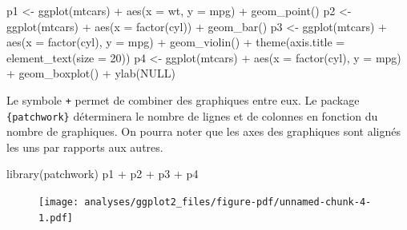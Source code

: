 \documentclass[
  letterpaper,
  DIV=11,
  numbers=noendperiod,
  oneside]{scrreprt}
\newenvironment{Shaded}{\begin{snugshade}}{\end{snugshade}}
\newcommand{\AttributeTok}[1]{\textcolor[rgb]{0.40,0.45,0.13}{#1}}
\newcommand{\ConstantTok}[1]{\textcolor[rgb]{0.56,0.35,0.01}{#1}}
\newcommand{\DecValTok}[1]{\textcolor[rgb]{0.68,0.00,0.00}{#1}}
\newcommand{\FunctionTok}[1]{\textcolor[rgb]{0.28,0.35,0.67}{#1}}
\newcommand{\NormalTok}[1]{\textcolor[rgb]{0.00,0.23,0.31}{#1}}
\newcommand{\OtherTok}[1]{\textcolor[rgb]{0.00,0.23,0.31}{#1}}
\newcommand{\SpecialCharTok}[1]{\textcolor[rgb]{0.37,0.37,0.37}{#1}}
\begin{document}
\begin{Shaded}
\begin{Highlighting}[]
\NormalTok{p1 }\OtherTok{\textless{}{-}} \FunctionTok{ggplot}\NormalTok{(mtcars) }\SpecialCharTok{+}
  \FunctionTok{aes}\NormalTok{(}\AttributeTok{x =}\NormalTok{ wt, }\AttributeTok{y =}\NormalTok{ mpg) }\SpecialCharTok{+} 
  \FunctionTok{geom\_point}\NormalTok{()}
\NormalTok{p2 }\OtherTok{\textless{}{-}} \FunctionTok{ggplot}\NormalTok{(mtcars) }\SpecialCharTok{+}
  \FunctionTok{aes}\NormalTok{(}\AttributeTok{x =} \FunctionTok{factor}\NormalTok{(cyl)) }\SpecialCharTok{+}
  \FunctionTok{geom\_bar}\NormalTok{()}
\NormalTok{p3 }\OtherTok{\textless{}{-}} \FunctionTok{ggplot}\NormalTok{(mtcars) }\SpecialCharTok{+}
  \FunctionTok{aes}\NormalTok{(}\AttributeTok{x =} \FunctionTok{factor}\NormalTok{(cyl), }\AttributeTok{y =}\NormalTok{ mpg) }\SpecialCharTok{+}
  \FunctionTok{geom\_violin}\NormalTok{() }\SpecialCharTok{+}
  \FunctionTok{theme}\NormalTok{(}\AttributeTok{axis.title =} \FunctionTok{element\_text}\NormalTok{(}\AttributeTok{size =} \DecValTok{20}\NormalTok{))}
\NormalTok{p4 }\OtherTok{\textless{}{-}} \FunctionTok{ggplot}\NormalTok{(mtcars) }\SpecialCharTok{+}
  \FunctionTok{aes}\NormalTok{(}\AttributeTok{x =} \FunctionTok{factor}\NormalTok{(cyl), }\AttributeTok{y =}\NormalTok{ mpg) }\SpecialCharTok{+} 
  \FunctionTok{geom\_boxplot}\NormalTok{() }\SpecialCharTok{+}
  \FunctionTok{ylab}\NormalTok{(}\ConstantTok{NULL}\NormalTok{)}
\end{Highlighting}
\end{Shaded}

Le symbole \texttt{+} permet de combiner des graphiques entre eux. Le
package \texttt{\{patchwork\}} déterminera le nombre de lignes et de
colonnes en fonction du nombre de graphiques. On pourra noter que les
axes des graphiques sont alignés les uns par rapports aux autres.

\begin{Shaded}
\begin{Highlighting}[]
\FunctionTok{library}\NormalTok{(patchwork)}
\NormalTok{p1 }\SpecialCharTok{+}\NormalTok{ p2 }\SpecialCharTok{+}\NormalTok{ p3 }\SpecialCharTok{+}\NormalTok{ p4}
\end{Highlighting}
\end{Shaded}

\begin{figure}[H]

{\centering \texttt{[image: analyses/ggplot2\_files/figure-pdf/unnamed-chunk-4-1.pdf]}

}

\end{figure}
\end{document}

